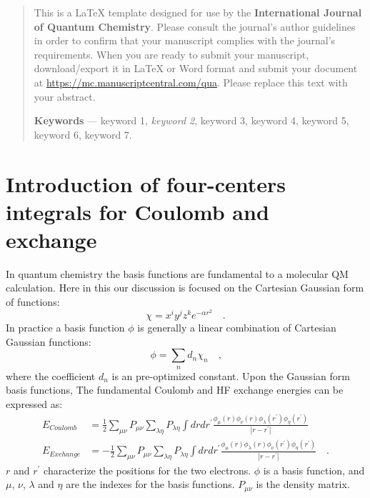 \documentclass[num-refs]{wiley-article}
\title{}
\author[1]{Fenglai Liu}
\affil[1]{Authorea}
\begin{document}
\maketitle
{}
\begin{abstract}
This is a LaTeX template designed for use by the \textbf{International Journal of Quantum Chemistry}. Please consult the journal's author guidelines in order to confirm that your manuscript complies with the journal's requirements. When you are ready to submit your manuscript, download/export it in LaTeX or Word format and submit your document at \href{https://mc.manuscriptcentral.com/qua}{https://mc.manuscriptcentral.com/qua}. Please replace this text with your abstract.

\textbf{Keywords} --- keyword 1, \emph{keyword 2}, keyword 3, keyword 4, keyword 5, keyword 6, keyword 7.%
\end{abstract}%

%
%


\section{Introduction of four-centers integrals for Coulomb and exchange}


 
In quantum chemistry the basis functions are fundamental to a molecular QM calculation. Here
in this our discussion is focused on the Cartesian Gaussian form of functions: 
\begin{equation}\label{work:1}
         \chi = x^{i}y^{j}z^{k}e^{-\alpha r^{2}} \quad \text{.}
\end{equation}
In practice a basis function $\phi$ is generally a linear combination of Cartesian 
Gaussian functions:
\begin{equation}\label{work:2}
         \phi = \sum_{n}d_{n}\chi_{n} \quad \text{,}
\end{equation}
where the coefficient $d_{n}$ is an pre-optimized constant. Upon the Gaussian form basis functions, The fundamental Coulomb and HF exchange energies can be expressed as:
\begin{align}
 \label{eq:1}
         E_{Coulomb}  &= \frac{1}{2}\sum_{\mu\nu}P_{\mu\nu}
 \sum_{\lambda\eta}P_{\lambda\eta}\int dr dr^{'}\frac{\phi_{\mu}(r)\phi_{\nu}(r)
 \phi_{\lambda}(r^{'})\phi_{\eta}(r^{'})} {|r - r^{'}|} \nonumber \\
         E_{Exchange} &= -\frac{1}{2}\sum_{\mu\nu}P_{\mu\nu}
 \sum_{\lambda\eta}P_{\lambda\eta}\int dr dr^{'}\frac{\phi_{\mu}(r)\phi_{\lambda}(r)
 \phi_{\nu}(r^{'})\phi_{\eta}(r^{'})} {|r - r^{'}|} \quad \text{.}
\end{align}
$r$ and $r^{'}$ characterize the positions for the two electrons.
$\phi$ is a basis function, and $\mu$, $\nu$, $\lambda$ and $\eta$ are the
indexes for the basis functions. $P_{\mu\nu}$ is the density
matrix.
\end{document}
